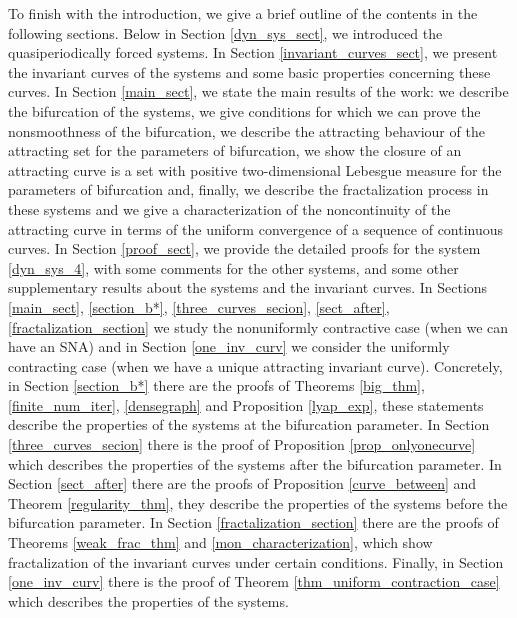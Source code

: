 \documentclass[12pt]{article}
\theoremstyle{plain}
\theoremstyle{remark}
\theoremstyle{definition}
\begin{document}
To finish with the introduction, we give a brief outline of the contents in the following sections.
Below in Section \ref{dyn_sys_sect}, we introduced the quasiperiodically forced systems. In Section \ref{invariant_curves_sect}, we present the invariant curves of the systems and some basic properties concerning these curves. In Section \ref{main_sect}, we state the main results of the work: we describe the bifurcation of the systems, we give conditions for which we can prove the nonsmoothness of the bifurcation, we describe the attracting behaviour of the attracting set for the parameters of bifurcation, we show the closure of an attracting curve is a set with positive two-dimensional Lebesgue measure for the parameters of bifurcation and, finally, we describe the fractalization process in these systems and we give a characterization of the noncontinuity of the attracting curve in terms of the uniform convergence of a sequence of continuous curves. In Section \ref{proof_sect}, we provide the detailed proofs for the system \eqref{dyn_sys_4}, with some comments for the other systems, and some other supplementary results about the systems and the invariant curves. In Sections \ref{main_sect}, \ref{section_b*}, \ref{three_curves_secion}, \ref{sect_after}, \ref{fractalization_section} we study the nonuniformly contractive case (when we can have an SNA) and in Section \ref{one_inv_curv} we consider the uniformly contracting case (when we have a unique attracting invariant curve). Concretely, in Section \ref{section_b*} there are the proofs of Theorems \ref{big_thm}, \ref{finite_num_iter}, \ref{densegraph} and Proposition \ref{lyap_exp}, these statements describe the properties of the systems at the bifurcation parameter. In Section \ref{three_curves_secion} there is the proof of Proposition \ref{prop_onlyonecurve} which describes the properties of the systems after the bifurcation parameter. In Section \ref{sect_after} there are the proofs of Proposition \ref{curve_between} and Theorem \ref{regularity_thm}, they describe the properties of the systems before the bifurcation parameter. In Section \ref{fractalization_section} there are the proofs of Theorems \ref{weak_frac_thm} and \ref{mon_characterization}, which show fractalization of the invariant curves under certain conditions. Finally, in Section \ref{one_inv_curv} there is the proof of Theorem \ref{thm_uniform_contraction_case} which describes the properties of the systems.
\end{document}
